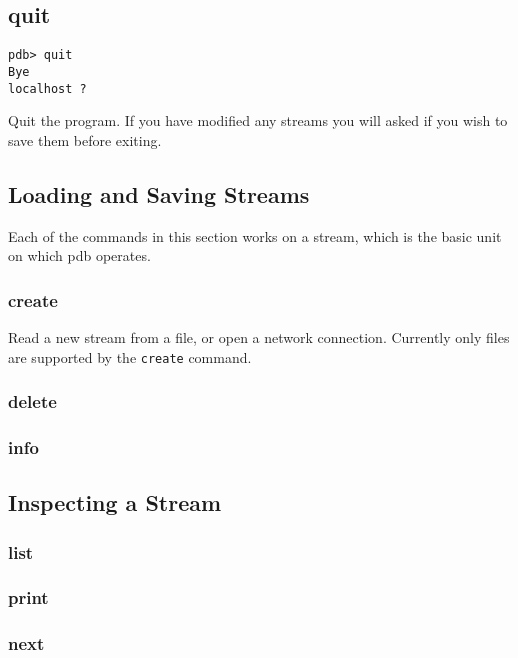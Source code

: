 \documentclass[11pt]{article}
\begin{document}
\subsection{quit}

\begin{verbatim}
pdb> quit
Bye
localhost ? 
\end{verbatim}

Quit the program.  If you have modified any streams you will asked if
you wish to save them before exiting.

\subsection{Loading and Saving Streams}

Each of the commands in this section works on a stream, which is the
basic unit on which pdb operates.

\subsubsection{create}

Read a new stream from a file, or open a network connection.
Currently only  files are supported by the \verb|create|
command.  

\subsubsection{delete}

\subsubsection{info}

\subsection{Inspecting a Stream}

\subsubsection{list}

\subsubsection{print}

\subsubsection{next}
\end{document}
